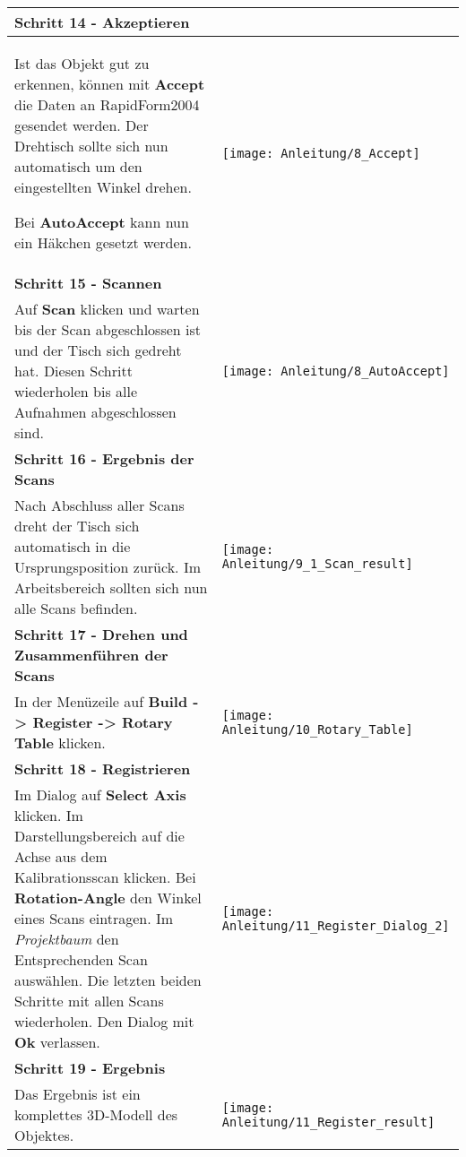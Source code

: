 \begin{longtable}{|>{\RaggedRight}m{5cm}|m{8cm}|}
\multicolumn{2}{|l|}%
{{\textbf{Schritt 14 - Akzeptieren}}}
\\ \hline
Ist das Objekt gut zu erkennen, können mit \textbf{Accept} die Daten an RapidForm2004 gesendet werden. Der Drehtisch sollte sich nun automatisch um den eingestellten Winkel drehen. 
\begin{TippS}Bei \textbf{AutoAccept} kann nun ein Häkchen gesetzt werden.\end{TippS}
& 
\texttt{[image: Anleitung/8\_Accept]}
\\ \hline  

\pagebreak

\multicolumn{2}{|l|}%
{{\textbf{Schritt 15 - Scannen}}}
\\ \hline
Auf \textbf{Scan} klicken und warten bis der Scan abgeschlossen ist und der Tisch sich gedreht hat.\linebreak
Diesen Schritt wiederholen bis alle Aufnahmen abgeschlossen sind.\linebreak
& 
\texttt{[image: Anleitung/8\_AutoAccept]}
\\ \hline  

\multicolumn{2}{|l|}%
{{\textbf{Schritt 16 - Ergebnis der Scans}}}
\\ \hline
Nach Abschluss aller Scans dreht der Tisch sich automatisch in die Ursprungsposition zurück.\linebreak
Im Arbeitsbereich sollten sich nun alle Scans befinden.
& 
\texttt{[image: Anleitung/9\_1\_Scan\_result]}
\\ \hline  

\pagebreak

\multicolumn{2}{|l|}%
{{\textbf{Schritt 17 - Drehen und Zusammenführen der Scans}}}
\\ \hline
In der Menüzeile auf \textbf{Build -> Register -> Rotary Table} klicken.\linebreak
& 
\texttt{[image: Anleitung/10\_Rotary\_Table]}
\\ \hline  

\multicolumn{2}{|l|}%
{{\textbf{Schritt 18 - Registrieren}}}
\\ \hline
Im Dialog auf \textbf{Select Axis} klicken.\linebreak
Im Darstellungsbereich auf die Achse aus dem Kalibrationsscan klicken.
Bei \textbf{Rotation-Angle} den Winkel eines Scans eintragen.\linebreak
Im \emph{Projektbaum} den Entsprechenden Scan auswählen.\linebreak
Die letzten beiden Schritte mit allen Scans wiederholen.\linebreak
Den Dialog mit \textbf{Ok} verlassen.
& 
\texttt{[image: Anleitung/11\_Register\_Dialog\_2]}
\\ \hline  

\pagebreak

\multicolumn{2}{|l|}%
{{\textbf{Schritt 19 - Ergebnis}}}
\\ \hline
Das Ergebnis ist ein komplettes 3D-Modell des Objektes.
& 
\texttt{[image: Anleitung/11\_Register\_result]}
\\ \hline  

\end{longtable} 